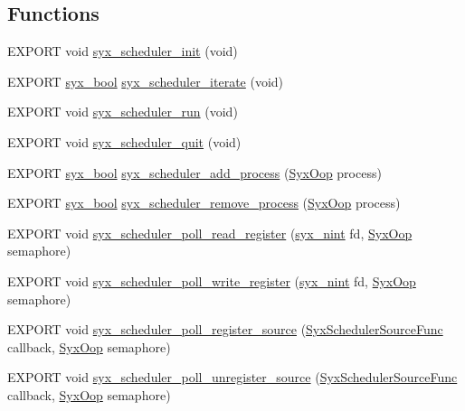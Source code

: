 \subsection*{Functions}
\begin{CompactItemize}
\item 
EXPORT void \hyperlink{syx-scheduler_8h_dabe27943d73201de5aecf72519a687a}{syx\_\-scheduler\_\-init} (void)
\item 
EXPORT \hyperlink{syx-types_8h_c6dc09b276b99fa1956364359139daab}{syx\_\-bool} \hyperlink{syx-scheduler_8h_17fade7b245e355201d773d0ba2286e0}{syx\_\-scheduler\_\-iterate} (void)
\item 
EXPORT void \hyperlink{syx-scheduler_8h_25f4d9193e601faf10f5937fb7c6b32e}{syx\_\-scheduler\_\-run} (void)
\item 
EXPORT void \hyperlink{syx-scheduler_8h_4bc3cad9e3d276d535f8d53e33c59501}{syx\_\-scheduler\_\-quit} (void)
\item 
EXPORT \hyperlink{syx-types_8h_c6dc09b276b99fa1956364359139daab}{syx\_\-bool} \hyperlink{syx-scheduler_8h_2fb86e1bdec4b10a406b9da39d671a2d}{syx\_\-scheduler\_\-add\_\-process} (\hyperlink{syx-types_8h_1121caba2d40b2ce090b640762744ccd}{SyxOop} process)
\item 
EXPORT \hyperlink{syx-types_8h_c6dc09b276b99fa1956364359139daab}{syx\_\-bool} \hyperlink{syx-scheduler_8h_382b95da8a6469cf53510b05ae655f5e}{syx\_\-scheduler\_\-remove\_\-process} (\hyperlink{syx-types_8h_1121caba2d40b2ce090b640762744ccd}{SyxOop} process)
\item 
EXPORT void \hyperlink{syx-scheduler_8h_599aa809cfc6c0074cc0736fd3ec64f7}{syx\_\-scheduler\_\-poll\_\-read\_\-register} (\hyperlink{syx-types_8h_488ad2504ade19c761a3e2a1726b4781}{syx\_\-nint} fd, \hyperlink{syx-types_8h_1121caba2d40b2ce090b640762744ccd}{SyxOop} semaphore)
\item 
EXPORT void \hyperlink{syx-scheduler_8h_7fa996684cc72d14c8d575539c027b64}{syx\_\-scheduler\_\-poll\_\-write\_\-register} (\hyperlink{syx-types_8h_488ad2504ade19c761a3e2a1726b4781}{syx\_\-nint} fd, \hyperlink{syx-types_8h_1121caba2d40b2ce090b640762744ccd}{SyxOop} semaphore)
\item 
EXPORT void \hyperlink{syx-scheduler_8h_09ca1323cd03da2a2b4ad2223d940c9e}{syx\_\-scheduler\_\-poll\_\-register\_\-source} (\hyperlink{syx-scheduler_8h_6c2e31a7f026cdd3d5eb1fc0d263c63a}{SyxSchedulerSourceFunc} callback, \hyperlink{syx-types_8h_1121caba2d40b2ce090b640762744ccd}{SyxOop} semaphore)
\item 
EXPORT void \hyperlink{syx-scheduler_8h_1034940b95289f30cbbadf9737f63f3c}{syx\_\-scheduler\_\-poll\_\-unregister\_\-source} (\hyperlink{syx-scheduler_8h_6c2e31a7f026cdd3d5eb1fc0d263c63a}{SyxSchedulerSourceFunc} callback, \hyperlink{syx-types_8h_1121caba2d40b2ce090b640762744ccd}{SyxOop} semaphore)
\end{CompactItemize}
